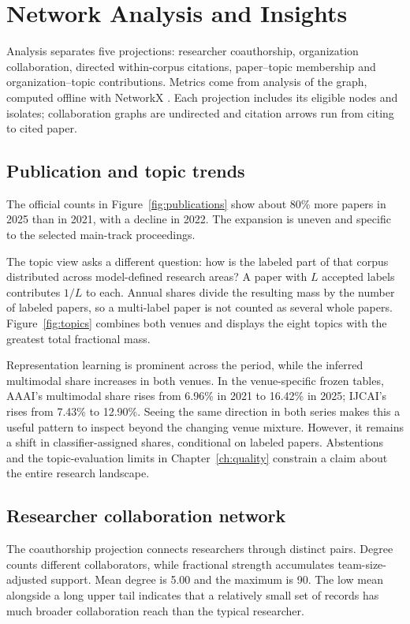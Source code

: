 \chapter{Network Analysis and Insights}
\label{ch:analysis}
Analysis separates five projections: researcher coauthorship, organization
collaboration, directed within-corpus citations, paper--topic membership and
organization--topic contributions. Metrics come from analysis of the graph,
computed offline with NetworkX \citep{networkxDocs}. Each projection includes
its eligible nodes and isolates; collaboration graphs are undirected and
citation arrows run from citing to cited paper.

\section{Publication and topic trends}
The official counts in Figure~\ref{fig:publications} show about 80\% more
papers in 2025 than in 2021, with a decline in 2022. The expansion is uneven
and specific to the selected main-track proceedings.

The topic view asks a different question: how is the labeled part of that
corpus distributed across model-defined research areas? A paper with $L$
accepted labels contributes $1/L$ to each. Annual shares divide the resulting
mass by the number of labeled papers, so a multi-label paper is not counted as
several whole papers. Figure~\ref{fig:topics} combines both venues and displays
the eight topics with the greatest total fractional mass.

\FloatBarrier

Representation learning is prominent across the period, while the inferred
multimodal share increases in both venues. In the venue-specific frozen tables,
AAAI's multimodal share rises from 6.96\% in 2021 to 16.42\% in 2025;
IJCAI's rises from 7.43\% to 12.90\%. Seeing the same direction in both series
makes this a useful pattern to inspect beyond the changing venue mixture.
However, it remains a shift in classifier-assigned shares, conditional on
labeled papers. Abstentions and the topic-evaluation limits in
Chapter~\ref{ch:quality} constrain a claim about the entire research landscape.

\section{Researcher collaboration network}
The coauthorship projection connects \Researchers{} researchers through
\CoauthorPairs{} distinct pairs. Degree counts different collaborators, while
fractional strength accumulates team-size-adjusted support. Mean degree is
5.00 and the maximum is 90. The low mean alongside a long upper tail indicates
that a relatively small set of records has much broader collaboration reach
than the typical researcher.

